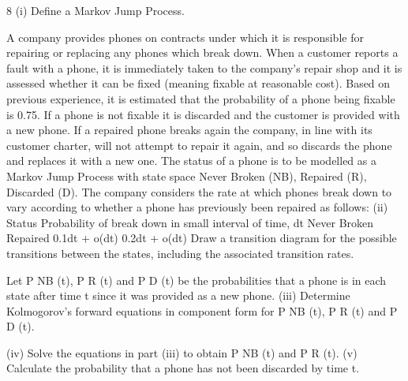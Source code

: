\documentclass[a4paper,12pt]{article}
\begin{document}
8
(i)
Define a Markov Jump Process.

A company provides phones on contracts under which it is responsible for repairing
or replacing any phones which break down.
When a customer reports a fault with a phone, it is immediately taken to the
company’s repair shop and it is assessed whether it can be fixed (meaning fixable at
reasonable cost). Based on previous experience, it is estimated that the probability of
a phone being fixable is 0.75. If a phone is not fixable it is discarded and the
customer is provided with a new phone.
If a repaired phone breaks again the company, in line with its customer charter, will
not attempt to repair it again, and so discards the phone and replaces it with a new
one.
The status of a phone is to be modelled as a Markov Jump Process with state space
{Never Broken (NB), Repaired (R), Discarded (D)}.
The company considers the rate at which phones break down to vary according to
whether a phone has previously been repaired as follows:
(ii)
Status Probability of break down in small
interval of time, dt
Never Broken
Repaired 0.1dt + o(dt)
0.2dt + o(dt)
Draw a transition diagram for the possible transitions between the states,
including the associated transition rates.

Let P NB (t), P R (t) and P D (t) be the probabilities that a phone is in each state after time t
since it was provided as a new phone.
(iii) Determine Kolmogorov’s forward equations in component form for P NB (t),
P R (t) and P D (t).

(iv) Solve the equations in part (iii) to obtain P NB (t) and P R (t).
(v) Calculate the probability that a phone has not been discarded by time t.
\end{document}
